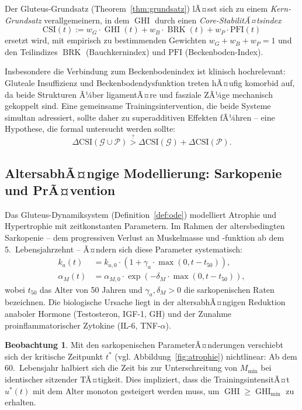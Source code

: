 ﻿\documentclass[12pt,a4paper]{report}
\theoremstyle{plain}
\theoremstyle{definition}
\newtheorem{beobachtung}[theorem]{Beobachtung}
\theoremstyle{remark}
\DeclareMathOperator{\GHI}{GHI}
\DeclareMathOperator{\BRK}{BRK}
\begin{document}
	Der Gluteus-Grundsatz (Theorem~\ref{thm:grundsatz}) lÃ¤sst sich zu einem
	\emph{Kern-Grundsatz} verallgemeinern, in dem $\GHI$ durch einen
	\emph{Core-StabilitÃ¤tsindex}
	\[
	\mathrm{CSI}(t) := w_G \cdot \GHI(t) + w_B \cdot \BRK(t) + w_P \cdot \mathrm{PFI}(t)
	\]
	ersetzt wird, mit empirisch zu bestimmenden Gewichten $w_G + w_B + w_P = 1$
	und den Teilindizes $\BRK$ (Bauchkernindex) und $\mathrm{PFI}$ (Beckenboden-Index).
	
	Insbesondere die Verbindung zum Beckenbodenindex ist klinisch hochrelevant:
	Gluteale Insuffizienz und Beckenbodendysfunktion treten hÃ¤ufig komorbid auf,
	da beide Strukturen Ã¼ber ligamentÃ¤re und fasziale ZÃ¼ge mechanisch gekoppelt sind.
	Eine gemeinsame Trainingsintervention, die beide Systeme simultan adressiert,
	sollte daher zu superadditiven Effekten fÃ¼hren -- eine Hypothese, die formal
	untersucht werden sollte:
	\[
	\Delta \mathrm{CSI}(\mathcal{G} \cup \mathcal{P}) \stackrel{?}{>}
	\Delta \mathrm{CSI}(\mathcal{G}) + \Delta \mathrm{CSI}(\mathcal{P}).
	\]
	
	\subsection{AltersabhÃ¤ngige Modellierung: Sarkopenie und PrÃ¤vention}
	\label{subsec:sarkopenie}
	
	Das Gluteus-Dynamiksystem (Definition~\ref{def:ode}) modelliert Atrophie
	und Hypertrophie mit zeitkonstanten Parametern. Im Rahmen der
	altersbedingten Sarkopenie -- dem progressiven Verlust an Muskelmasse
	und -funktion ab dem 5.~Lebensjahrzehnt -- Ã¤ndern sich diese Parameter
	systematisch:
	\begin{align*}
		k_a(t) &= k_{a,0} \cdot \left(1 + \gamma_a \cdot \max(0, t - t_{50})\right), \\
		\alpha_M(t) &= \alpha_{M,0} \cdot \exp\!\left(-\delta_M \cdot \max(0, t - t_{50})\right),
	\end{align*}
	wobei $t_{50}$ das Alter von 50 Jahren und $\gamma_a, \delta_M > 0$
	die sarkopenischen Raten bezeichnen. Die biologische Ursache liegt in
	der altersabhÃ¤ngigen Reduktion anaboler Hormone (Testosteron, IGF-1, GH)
	und der Zunahme proinflammatorischer Zytokine (IL-6, TNF-$\alpha$).
	
	\begin{beobachtung}
		Mit den sarkopenischen ParameterÃ¤nderungen verschiebt sich der kritische
		Zeitpunkt $t^*$ (vgl. Abbildung~\ref{fig:atrophie}) nichtlinear:
		Ab dem 60.~Lebensjahr halbiert sich die Zeit bis zur Unterschreitung
		von $M_{\min}$ bei identischer sitzender TÃ¤tigkeit. Dies impliziert,
		dass die TrainingsintensitÃ¤t $u^*(t)$ mit dem Alter monoton gesteigert
		werden muss, um $\GHI \geq \GHI_{\min}$ zu erhalten.
	\end{beobachtung}
	
\end{document}
